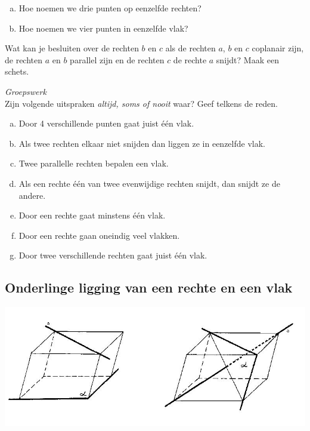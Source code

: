 \documentclass[12pt,twoside]{article}
\begin{document}
\begin{oefening}
\begin{enumerate}[(a)]
  \item Hoe noemen we drie punten op eenzelfde rechten?
  \item Hoe noemen we vier punten in eenzelfde vlak?
\end{enumerate}
\end{oefening}

\begin{oefening}
Wat kan je besluiten over de rechten $b$ en $c$ als de rechten $a$, $b$ en $c$ coplanair zijn, de rechten $a$ en $b$ parallel zijn en de rechten $c$ de rechte $a$ snijdt? Maak een schets.
\end{oefening}

\begin{oefening} {\em Groepswerk}\\
Zijn volgende uitspraken {\em altijd, soms of nooit} waar? Geef telkens de reden.
\begin{enumerate}[(a)]
  \item Door 4 verschillende punten gaat juist één vlak.
  \item Als twee rechten elkaar niet snijden dan liggen ze in eenzelfde vlak.
  \item Twee parallelle rechten bepalen een vlak.
  \item Als een rechte één van twee evenwijdige rechten snijdt, dan snijdt ze de andere.
  \item Door een rechte gaat minstens één vlak.
  \item Door een rechte gaan oneindig veel vlakken.
  \item Door twee verschillende rechten gaat juist één vlak.
\end{enumerate}
\end{oefening}



\subsection{Onderlinge ligging van een rechte en een vlak}

\begin{center}
  \includegraphics[width=\textwidth]{onderlinge_ligging_rechte_vlak}
\end{center}
\end{document}
